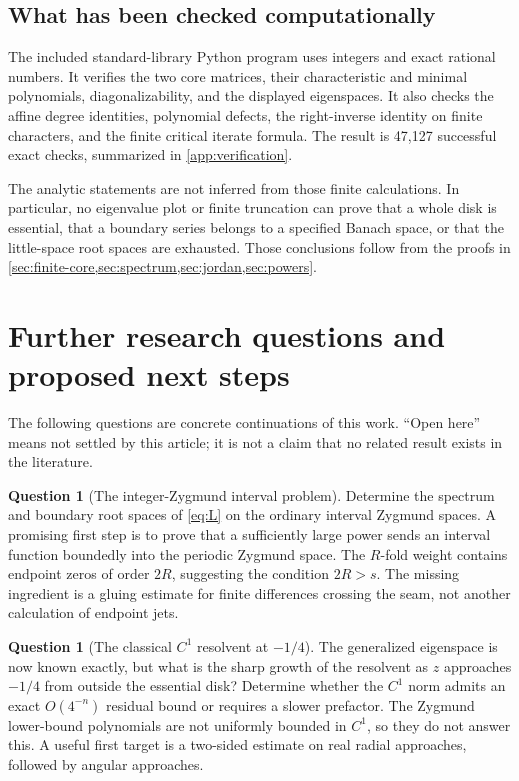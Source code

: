 \documentclass[11pt,a4paper]{article}
\numberwithin{equation}{section}
\theoremstyle{definition}
\newtheorem{question}[theorem]{Question}
\theoremstyle{remark}
\begin{document}
\subsection{What has been checked computationally}
The included standard-library Python program uses integers and exact
rational numbers. It verifies the two core matrices, their characteristic
and minimal polynomials, diagonalizability, and the displayed eigenspaces.
It also checks the affine degree identities, polynomial defects, the
right-inverse identity on finite characters, and the finite critical
iterate formula. The result is 47,127 successful exact checks,
summarized in \cref{app:verification}.

The analytic statements are not inferred from those finite calculations.
In particular, no eigenvalue plot or finite truncation can prove that a
whole disk is essential, that a boundary series belongs to a specified
Banach space, or that the little-space root spaces are exhausted.
Those conclusions follow from the proofs in
\cref{sec:finite-core,sec:spectrum,sec:jordan,sec:powers}.

\section{Further research questions and proposed next steps}
\label{sec:future}

The following questions are concrete continuations of this work.
``Open here'' means not settled by this article; it is not a claim that
no related result exists in the literature.

\begin{question}[The integer-Zygmund interval problem]
Determine the spectrum and boundary root spaces of \eqref{eq:L} on
the ordinary interval Zygmund spaces. A promising first step is to prove
that a sufficiently large power sends an interval function boundedly
into the periodic Zygmund space. The $R$-fold weight contains endpoint
zeros of order $2R$, suggesting the condition $2R>s$. The missing
ingredient is a gluing estimate for finite differences crossing the
seam, not another calculation of endpoint jets.
\end{question}

\begin{question}[The classical $C^1$ resolvent at $-1/4$]
The generalized eigenspace is now known exactly, but what is the sharp
growth of the resolvent as $z$ approaches $-1/4$ from outside the
essential disk? Determine whether the $C^1$ norm admits an exact
$O(4^{-n})$ residual bound or requires a slower prefactor. The
Zygmund lower-bound polynomials are not uniformly bounded in $C^1$,
so they do not answer this. A useful first target is a two-sided
estimate on real radial approaches, followed by angular approaches.
\end{question}
\end{document}
